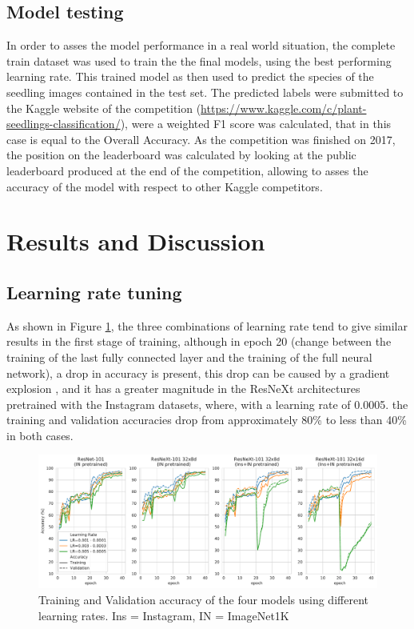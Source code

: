 \documentclass[10pt,onecolumn,titlepage,letterpaper]{article}
\begin{document}
\subsection{Model testing}

In order to asses the model performance in a real world situation, the complete train dataset was used to train the the final models, using the best performing learning rate. This trained model as then used to predict the species of the seedling images contained in the test set. The predicted labels were submitted to the Kaggle website of the competition (\url{https://www.kaggle.com/c/plant-seedlings-classification/}), were a weighted F1 score was calculated, that in this case is equal to the Overall Accuracy. As the competition was finished on 2017, the position on the leaderboard was calculated by looking at the public leaderboard produced at the end of the competition, allowing to asses the accuracy of the model with respect to other Kaggle competitors.

\section{Results and Discussion}

\subsection{Learning rate tuning}

As shown in Figure \ref{fig:lr}, the three combinations of learning rate tend to give similar results in the first stage of training, although in epoch 20 (change between the training of the last fully connected layer and the training of the full neural network), a drop in accuracy is present, this drop can be caused by a gradient explosion \cite{Aghdam2017}, and it has a greater magnitude in the ResNeXt architectures pretrained with the Instagram datasets, where, with a learning rate of 0.0005. the training and validation accuracies drop from approximately 80\% to less than 40\% in both cases.

\begin{figure}[h]
	\begin{center}
		\includegraphics[width=1.0\linewidth]{lr_4models.pdf}
	\end{center}
	\caption{Training and Validation accuracy of the four models using different learning rates. Ins = Instagram, IN = ImageNet1K}
	\label{fig:lr}
\end{figure}
\end{document}
